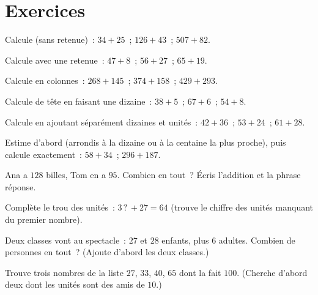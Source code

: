 \section{Exercices}

\begin{exercise}[$\star$]\label{exo:g2:addition:1}
Calcule (sans retenue)~: $34 + 25$~; \quad $126 + 43$~; \quad
$507 + 82$.
\end{exercise}

\begin{exercise}[$\star$]\label{exo:g2:addition:2}
Calcule avec une retenue~: $47 + 8$~; \quad $56 + 27$~; \quad
$65 + 19$.
\end{exercise}

\begin{exercise}[$\star$]\label{exo:g2:addition:3}
Calcule en colonnes~: $268 + 145$~; \quad $374 + 158$~; \quad
$429 + 293$.
\end{exercise}

\begin{exercise}[$\star$]\label{exo:g2:addition:4}
Calcule de tête en faisant une dizaine~: $38 + 5$~; \quad
$67 + 6$~; \quad $54 + 8$.
\end{exercise}

\begin{exercise}[$\star$]\label{exo:g2:addition:5}
Calcule en ajoutant séparément dizaines et unités~:
$42 + 36$~; \quad $53 + 24$~; \quad $61 + 28$.
\end{exercise}

\begin{exercise}[$\star$]\label{exo:g2:addition:6}
Estime d'abord (arrondis à la dizaine ou à la centaine la plus
proche), puis calcule exactement~: $58 + 34$~; \quad $296 + 187$.
\end{exercise}

\begin{exercise}[$\star$]\label{exo:g2:addition:7}
\guillemotleft{} Ana a $128$ billes, Tom en a $95$. Combien en
tout~? \guillemotright{} Écris l'addition et la phrase réponse.
\end{exercise}

\begin{exercise}[$\star$]\label{exo:g2:addition:8}
Complète le trou des unités~: $3\,?\, + 27 = 64$ (trouve le
chiffre des unités manquant du premier nombre).
\end{exercise}

\begin{exercise}[$\star$]\label{exo:g2:addition:9}
Deux classes vont au spectacle~: $27$ et $28$ enfants, plus $6$
adultes. Combien de personnes en tout~? (Ajoute d'abord les deux
classes.)
\end{exercise}

\begin{exercise}[$\star\star$]\label{exo:g2:addition:10}
Trouve trois nombres de la liste $27$, $33$, $40$, $65$ dont la
 fait $100$. (Cherche d'abord deux dont les unités sont des
amis de $10$.)
\end{exercise}
